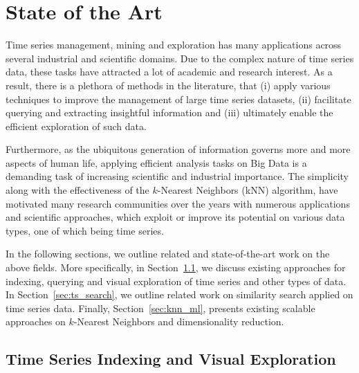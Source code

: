 
\chapter{State of the Art} \label{chap:related}
\graphicspath{{Papers/SIGSpatial2017/}{Papers/SIGSpatial2018/}{Papers/SpringerJournalOfBigData/}}

Time series management, mining and exploration has many applications across several industrial and scientific domains. Due to the complex nature of time series data, these tasks have attracted a lot of academic and research interest. As a result, there is a plethora of methods in the literature, that (i) apply various techniques to improve the management of large time series datasets, (ii) facilitate querying and extracting insightful information and (iii) ultimately enable the efficient exploration of such data. 

Furthermore, as the ubiquitous generation of information governs more and more aspects of human life, applying efficient analysis tasks on Big Data is a demanding task of increasing scientific and industrial importance. The simplicity along with the effectiveness of the $k$-Nearest Neighbors (kNN) algorithm, have motivated many research communities over the years with numerous applications and scientific approaches, which exploit or improve its potential on various data types, one of which being time series.

In the following sections, we outline related and state-of-the-art work on the above fields. More specifically, in Section~\ref{sec:ts_index_query_explore}, we discuss existing approaches for indexing, querying and visual exploration of time series and other types of data. In Section~\ref{sec:ts_search}, we outline related work on similarity search applied on time series data. Finally, Section~\ref{sec:knn_ml}, presents existing scalable approaches on $k$-Nearest Neighbors and dimensionality reduction.

\section{Time Series Indexing and Visual Exploration}
\label{sec:ts_index_query_explore}

